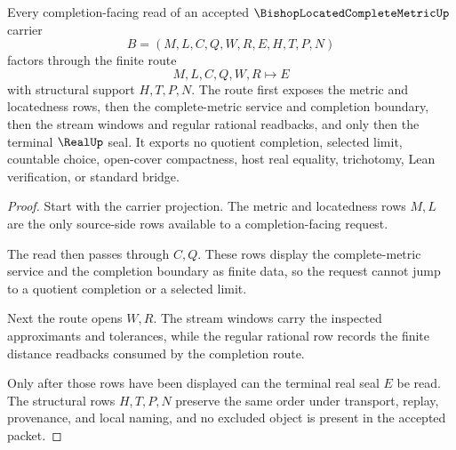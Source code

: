 \begin{theorem}
\label{thm:bishop-located-complete-metric-finite-completion-route}
Every completion-facing read of an accepted $\BishopLocatedCompleteMetricUp$ carrier
$$
B=(M,L,C,Q,W,R,E,H,T,P,N)
$$
factors through the finite route
$$
M,L,C,Q,W,R \longmapsto E
$$
with structural support $H,T,P,N$. The route first exposes the metric and locatedness rows, then the complete-metric service and completion boundary, then the stream windows and regular rational readbacks, and only then the terminal $\RealUp$ seal. It exports no quotient completion, selected limit, countable choice, open-cover compactness, host real equality, trichotomy, Lean verification, or standard bridge.
\end{theorem}
\begin{proof}
Start with the carrier projection. The metric and locatedness rows $M,L$ are the only source-side rows available to a completion-facing request.

The read then passes through $C,Q$. These rows display the complete-metric service and the completion boundary as finite data, so the request cannot jump to a quotient completion or a selected limit.

Next the route opens $W,R$. The stream windows carry the inspected approximants and tolerances, while the regular rational row records the finite distance readbacks consumed by the completion route.

Only after those rows have been displayed can the terminal real seal $E$ be read. The structural rows $H,T,P,N$ preserve the same order under transport, replay, provenance, and local naming, and no excluded object is present in the accepted packet.
\end{proof}


